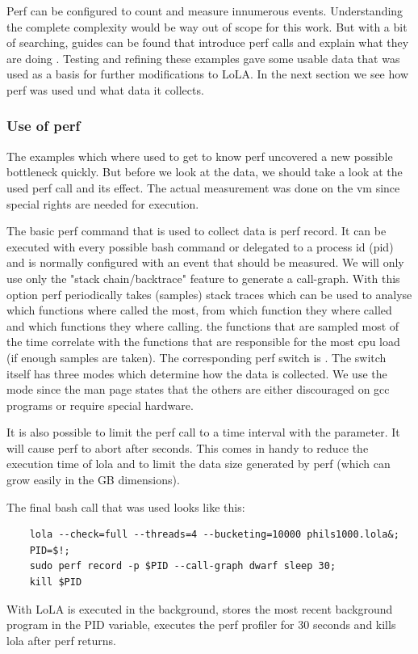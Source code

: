 Perf can be configured to count and measure innumerous events. Understanding the complete complexity would be way out of scope for this work. But with a bit of searching, guides can be found that introduce perf calls and explain what they are doing \cite{perfExamples}. Testing and refining these examples gave some usable data that was used as a basis for further modifications to LoLA. In the next section we see how perf was used und what data it collects.

\subsubsection{Use of perf}
The examples which where used to get to know perf uncovered a new possible bottleneck quickly. But before we look at the data, we should take a look at the used perf call and its effect. The actual measurement was done on the vm since special rights are needed for execution.

The basic perf command that is used to collect data is perf record. It can be executed with every possible bash command or delegated to a process id (pid) and is normally configured with an event that should be measured. We will only use only the "stack chain/backtrace" feature to generate a call-graph. With this option perf periodically takes (samples) stack traces which can be used to analyse which functions where called the most, from which function they where called and which functions they where calling. the functions that are sampled most of the time correlate with the functions that are responsible for the most cpu load (if enough samples are taken). The corresponding perf switch is . The switch itself has three modes which determine how the data is collected. We use the  mode since the man page states that the others are either discouraged on gcc programs or require special hardware.

It is also possible to limit the perf call to a time interval with the  parameter. It will cause perf to abort after  seconds. This comes in handy to reduce the execution time of lola and to limit the data size generated by perf (which can grow easily in the GB dimensions).

The final bash call that was used looks like this:
\begin{lstlisting}
    lola --check=full --threads=4 --bucketing=10000 phils1000.lola&;
    PID=$!;
    sudo perf record -p $PID --call-graph dwarf sleep 30;
    kill $PID
\end{lstlisting}
With  LoLA  is executed in the background,  stores the most recent background program in the PID variable,  executes the perf profiler for 30 seconds and  kills lola after perf returns.

